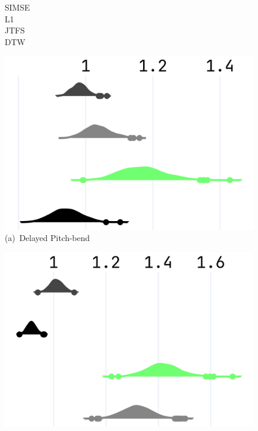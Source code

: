 \begin{figure}[t]
  \centering
  \begin{minipage}[t]{0.045\textwidth}
    \footnotesize\raggedleft
    \vspace{-3cm} %
    SIMSE\\[0.4cm]
    L1\\[0.385cm]
    JTFS\\[0.365cm]
    DTW
  \end{minipage}%
  \hspace{0.01\textwidth}%
  \begin{minipage}[t]{0.94\textwidth}
    \centering
    \begin{minipage}[t]{0.31\textwidth}
      \centering
      \includegraphics[width=\linewidth]{images/npsk_ood_P_Loss_6.png}
      \vspace{0.3em}
      \footnotesize (a)~Delayed Pitch-bend
    \end{minipage}
    \hspace{0.015\textwidth}
    \begin{minipage}[t]{0.31\textwidth}
      \centering
      \includegraphics[width=\linewidth]{images/npsk_ood_P_Loss_4.png}

\end{minipage}
\end{minipage}
\end{figure}
